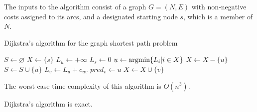 \documentclass[12pt, a4paper]{report}
\begin{document}
    The inputs to the algorithm consist of a graph $G=(N, E)$ with non-negative costs assigned to its arcs, and a designated starting node $s$, which is a member of $N$.
    \begin{algorithm}[H]
        \caption{Dijkstra's algorithm for the graph shortest path problem}
            \begin{algorithmic}[1]
                \State $S \leftarrow \varnothing$
                \State $X \leftarrow \{s\}$
                    \State $L_u \leftarrow +\infty$
                \EndFor
                \State $L_s \leftarrow 0$
                    \State $u \leftarrow \textnormal{argmin}\{L_i|i \in X\}$
                    \State $X \leftarrow X-\{u\}$
                    \State $S \leftarrow S \cup \{u\}$
                        \State $L_v \leftarrow L_u+c_{uv}$
                        \State $pred_v \leftarrow u$
                        \State $X \leftarrow X \cup \{v\}$
                    \EndFor
                \EndWhile
            \end{algorithmic}
    \end{algorithm}
    The worst-case time complexity of this algorithm is $O(n^3)$. 
    \begin{proposition}
        Dijkstra's algorithm is exact. 
    \end{proposition}
\end{document}
